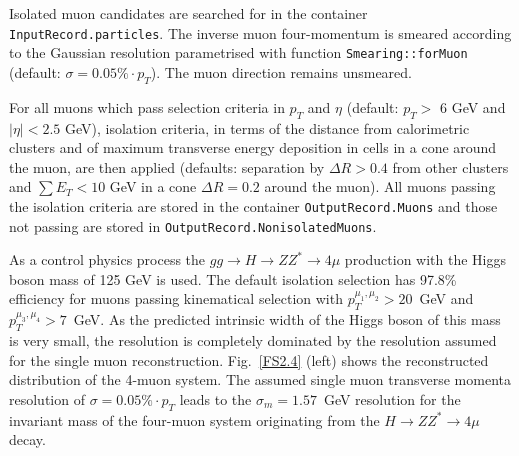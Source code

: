 Isolated muon candidates are searched for in the container
{\tt InputRecord.particles}. The inverse muon four-momentum is
smeared according to the Gaussian resolution parametrised with
function {\tt Smearing::forMuon} (default: $\sigma = 0.05\% \cdot p_{T}$).
 The muon direction remains unsmeared.

For all muons which pass selection criteria in $p_T$ and $\eta$
(default: $p_T >$ 6 GeV and $|\eta| < 2.5$ GeV), isolation criteria,
in terms of the distance from calorimetric  clusters and of
maximum transverse energy 
deposition in cells in a cone around the muon, are then applied
(defaults: separation by $\Delta R > 0.4$ from other clusters and
$\sum E_T < 10$ GeV in a cone  $\Delta R = 0.2$ around the muon).
All muons passing the isolation criteria are stored in the container
{\tt OutputRecord.Muons} and those not passing are stored in
 {\tt OutputRecord.NonisolatedMuons}. 
 
As a control physics process  the
 $gg \to H \to ZZ^* \to 4 \mu $ production with the 
Higgs boson mass of 125 GeV is used. The default
isolation selection has 97.8\% efficiency for muons passing kinematical selection  with 
$p_T^{\mu_1, \mu_2} > 20$~GeV and $p_T^{\mu_3, \mu_4} > 7$~GeV. 
As the predicted intrinsic width
of the Higgs boson of this mass is very small, the resolution is
completely dominated by the resolution assumed for the 
single muon reconstruction. Fig.~\ref{FS2.4} (left) shows the
reconstructed distribution of the 4-muon system.
The assumed single muon transverse momenta resolution
 of $\sigma = 0.05\% \cdot p_T$
leads to the $\sigma_m = 1.57$~GeV resolution for the invariant mass
of the four-muon system originating from the $ H \to ZZ^* \to 4 \mu $
decay. 



